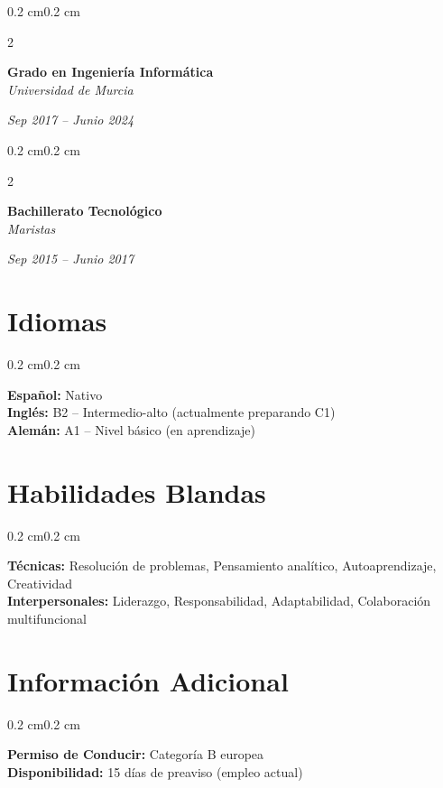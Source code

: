 \documentclass[10pt, letterpaper]{article}
\newenvironment{onecolentry}{
    \begin{adjustwidth}{0.2 cm}{0.2 cm}
}{
    \end{adjustwidth}
}
\newenvironment{twocolentry}[2][]{
    \onecolentry
    \def\secondColumn{#2}
    \setcolumnwidth{\fill, 4.5 cm}
    \begin{paracol}{2}
}{
    \switchcolumn \raggedleft \secondColumn
    \end{paracol}
    \endonecolentry
}
\begin{document}
    \begin{twocolentry}{\textit{Sep 2017 -- Junio 2024}}
        \textbf{Grado en Ingeniería Informática} \\
        \textit{Universidad de Murcia}
    \end{twocolentry}
    
    \begin{twocolentry}{\textit{Sep 2015 -- Junio 2017}}
        \textbf{Bachillerato Tecnológico} \\
        \textit{Maristas}
    \end{twocolentry}

    \section{Idiomas}
    \begin{onecolentry}
        \textbf{Español:} Nativo \\
        \textbf{Inglés:} B2 – Intermedio-alto (actualmente preparando C1) \\
        \textbf{Alemán:} A1 – Nivel básico (en aprendizaje)
    \end{onecolentry}

    \section{Habilidades Blandas}
    \begin{onecolentry}
        \textbf{Técnicas:} Resolución de problemas, Pensamiento analítico, Autoaprendizaje, Creatividad \\
        \textbf{Interpersonales:} Liderazgo, Responsabilidad, Adaptabilidad, Colaboración multifuncional
    \end{onecolentry}

    \section{Información Adicional}
    \begin{onecolentry}
        \textbf{Permiso de Conducir:} Categoría B europea \\
        \textbf{Disponibilidad:} 15 días de preaviso (empleo actual)
    \end{onecolentry}
\end{document}
